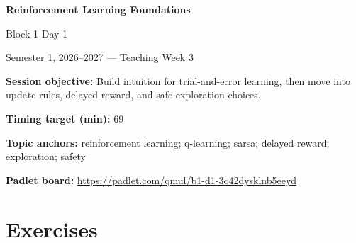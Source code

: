 \documentclass[11pt]{article}
\begin{document}
\begin{center}\LARGE\bfseries Reinforcement Learning Foundations\end{center}

\begin{center}\large Block 1 Day 1\end{center}

\begin{center}Semester 1, 2026--2027 --- Teaching Week 3\end{center}

\begin{tcolorbox}[colback=MidnightBlue!4,colframe=MidnightBlue,title={Session Overview},fonttitle=\bfseries,breakable]
\textbf{Session objective:} Build intuition for trial-and-error learning, then move into update rules, delayed reward, and safe exploration choices.

\textbf{Timing target (min):} 69

\textbf{Topic anchors:} reinforcement learning; q-learning; sarsa; delayed reward; exploration; safety

\textbf{Padlet board:} \url{https://padlet.com/qmul/b1-d1-3o42dysklnb5eeyd}
\end{tcolorbox}

\section*{Exercises}
\end{document}
